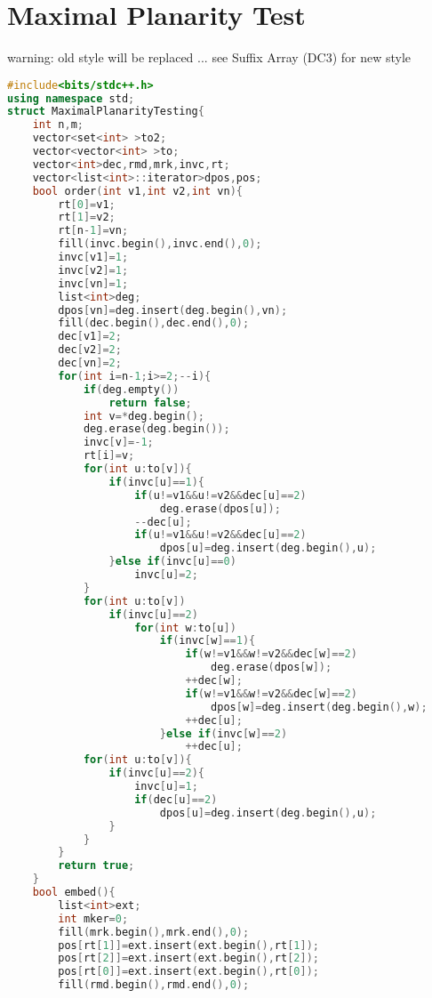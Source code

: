 \documentclass{book}
\begin{document}
\section{Maximal Planarity Test}
warning: old style will be replaced ... see Suffix Array (DC3) for new style\begin{lstlisting}[language=C++,title={Maximal Planarity Test.hpp (5195 bytes, 165 lines)}]
#include<bits/stdc++.h>
using namespace std;
struct MaximalPlanarityTesting{
    int n,m;
    vector<set<int> >to2;
    vector<vector<int> >to;
    vector<int>dec,rmd,mrk,invc,rt;
    vector<list<int>::iterator>dpos,pos;
    bool order(int v1,int v2,int vn){
        rt[0]=v1;
        rt[1]=v2;
        rt[n-1]=vn;
        fill(invc.begin(),invc.end(),0);
        invc[v1]=1;
        invc[v2]=1;
        invc[vn]=1;
        list<int>deg;
        dpos[vn]=deg.insert(deg.begin(),vn);
        fill(dec.begin(),dec.end(),0);
        dec[v1]=2;
        dec[v2]=2;
        dec[vn]=2;
        for(int i=n-1;i>=2;--i){
            if(deg.empty())
                return false;
            int v=*deg.begin();
            deg.erase(deg.begin());
            invc[v]=-1;
            rt[i]=v;
            for(int u:to[v]){
                if(invc[u]==1){
                    if(u!=v1&&u!=v2&&dec[u]==2)
                        deg.erase(dpos[u]);
                    --dec[u];
                    if(u!=v1&&u!=v2&&dec[u]==2)
                        dpos[u]=deg.insert(deg.begin(),u);
                }else if(invc[u]==0)
                    invc[u]=2;
            }
            for(int u:to[v])
                if(invc[u]==2)
                    for(int w:to[u])
                        if(invc[w]==1){
                            if(w!=v1&&w!=v2&&dec[w]==2)
                                deg.erase(dpos[w]);
                            ++dec[w];
                            if(w!=v1&&w!=v2&&dec[w]==2)
                                dpos[w]=deg.insert(deg.begin(),w);
                            ++dec[u];
                        }else if(invc[w]==2)
                            ++dec[u];
            for(int u:to[v]){
                if(invc[u]==2){
                    invc[u]=1;
                    if(dec[u]==2)
                        dpos[u]=deg.insert(deg.begin(),u);
                }
            }
        }
        return true;
    }
    bool embed(){
        list<int>ext;
        int mker=0;
        fill(mrk.begin(),mrk.end(),0);
        pos[rt[1]]=ext.insert(ext.begin(),rt[1]);
        pos[rt[2]]=ext.insert(ext.begin(),rt[2]);
        pos[rt[0]]=ext.insert(ext.begin(),rt[0]);
        fill(rmd.begin(),rmd.end(),0);

\end{lstlisting}
\end{document}
